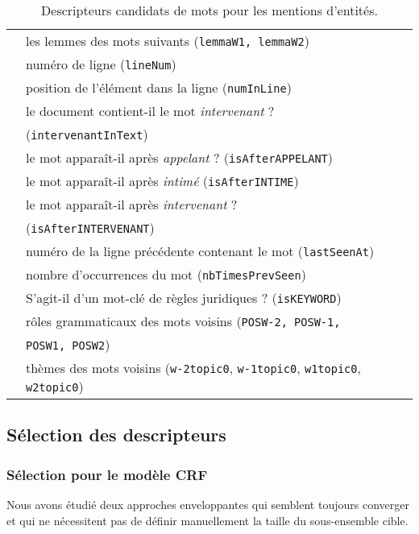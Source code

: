 \begin{table}[!htb]
\begin{tabular}{|l|p{}|}
	& \tabitem les lemmes des mots suivants  (\verb|lemmaW1, lemmaW2|) \\
	& \tabitem numéro de ligne (\verb|lineNum|) \\ 
	& \tabitem position de l'élément dans la ligne (\verb|numInLine|) \\
	& \tabitem \og le document contient-il le mot \textit{intervenant} ? \fg{} \\
	& (\verb|intervenantInText|) \\
	& \tabitem \og le mot apparaît-il après \textit{appelant} ? \fg{} (\verb|isAfterAPPELANT|) \\
	& \tabitem \og le mot apparaît-il après \textit{intimé} \fg{} (\verb|isAfterINTIME|)\\
	& \tabitem \og le mot apparaît-il après  \textit{intervenant} ? \fg{} \\ 
	& (\verb|isAfterINTERVENANT|) \\
	& \tabitem numéro de la ligne précédente contenant le mot (\verb|lastSeenAt|)\\
	& \tabitem nombre d'occurrences du mot (\verb|nbTimesPrevSeen|)\\
	& \tabitem \og S'agit-il d'un mot-clé de règles juridiques ? \fg{} (\verb|isKEYWORD|) \\
	& \tabitem rôles grammaticaux des mots voisins (\texttt{POSW-2, POSW-1,} \\ 
	& \texttt{POSW1, POSW2}) \\ 
	& \tabitem thèmes des mots voisins (\verb|w-2topic0|, \verb|w-1topic0|, \verb|w1topic0|, \verb|w2topic0|) \\ 
	 \hline
	\end{tabular}	
	\caption{Descripteurs candidats de mots pour les mentions d'entités.} \label{tab:structuration:descripteursmots}
\end{table}

\subsection{Sélection des descripteurs}
\subsubsection{Sélection  pour le modèle CRF}
 Nous avons étudié deux approches enveloppantes qui semblent toujours converger et qui ne nécessitent pas de définir manuellement la taille du sous-ensemble cible. %

